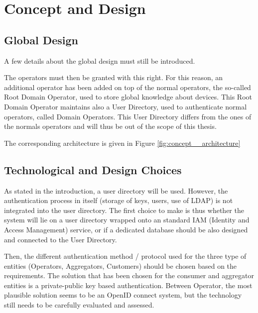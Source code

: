 \chapter{Concept and Design}
\label{cha:conceptanddesign}

\section{Global Design}
A few details about the global design must still be introduced.



The operators must then be granted with this right. For this reason, an additional operator has been added on top of the normal operators, the so-called Root Domain Operator, used to store global knowledge about devices. This Root Domain Operator maintains also a User Directory, used to authenticate normal operators, called Domain Operators. This User Directory differs from the ones of the normals operators and will thus be out of the scope of this thesis.


The corresponding architecture is given in Figure \ref{fig:concept__architecture}



\section{Technological and Design Choices}
As stated in the introduction, a user directory will be used. However, the authentication process in itself (storage of keys, users, use of LDAP) is not integrated into the user directory. The first choice to make is thus whether the system will lie on a user directory wrapped onto an standard IAM (Identity and Access Management) service, or if a dedicated database should be also designed and connected to the User Directory.

Then, the different authentication method /  protocol used for the three type of entities (Operators, Aggregators, Customers) should be chosen based on the requirements. The solution that has been chosen for the consumer and aggregator entities is a private-public key based authentication. Between Operator, the most plausible solution seems to be an OpenID connect system, but the technology still needs to be carefully evaluated and assessed. 

